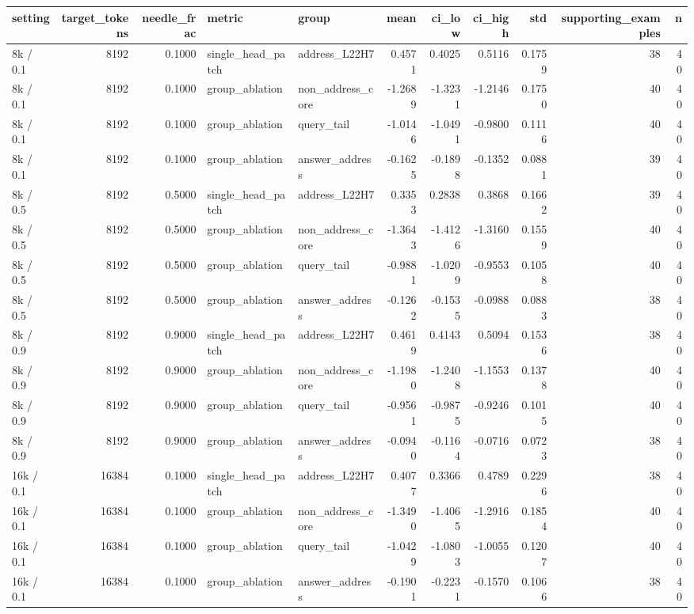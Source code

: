 \begin{tabular}{lrrllrrrrrr}
\toprule
setting & target_tokens & needle_frac & metric & group & mean & ci_low & ci_high & std & supporting_examples & n \\
\midrule
8k / 0.1 & 8192 & 0.1000 & single_head_patch & address_L22H7 & 0.4571 & 0.4025 & 0.5116 & 0.1759 & 38 & 40 \\
8k / 0.1 & 8192 & 0.1000 & group_ablation & non_address_core & -1.2689 & -1.3231 & -1.2146 & 0.1750 & 40 & 40 \\
8k / 0.1 & 8192 & 0.1000 & group_ablation & query_tail & -1.0146 & -1.0491 & -0.9800 & 0.1116 & 40 & 40 \\
8k / 0.1 & 8192 & 0.1000 & group_ablation & answer_address & -0.1625 & -0.1898 & -0.1352 & 0.0881 & 39 & 40 \\
8k / 0.5 & 8192 & 0.5000 & single_head_patch & address_L22H7 & 0.3353 & 0.2838 & 0.3868 & 0.1662 & 39 & 40 \\
8k / 0.5 & 8192 & 0.5000 & group_ablation & non_address_core & -1.3643 & -1.4126 & -1.3160 & 0.1559 & 40 & 40 \\
8k / 0.5 & 8192 & 0.5000 & group_ablation & query_tail & -0.9881 & -1.0209 & -0.9553 & 0.1058 & 40 & 40 \\
8k / 0.5 & 8192 & 0.5000 & group_ablation & answer_address & -0.1262 & -0.1535 & -0.0988 & 0.0883 & 38 & 40 \\
8k / 0.9 & 8192 & 0.9000 & single_head_patch & address_L22H7 & 0.4619 & 0.4143 & 0.5094 & 0.1536 & 38 & 40 \\
8k / 0.9 & 8192 & 0.9000 & group_ablation & non_address_core & -1.1980 & -1.2408 & -1.1553 & 0.1378 & 40 & 40 \\
8k / 0.9 & 8192 & 0.9000 & group_ablation & query_tail & -0.9561 & -0.9875 & -0.9246 & 0.1015 & 40 & 40 \\
8k / 0.9 & 8192 & 0.9000 & group_ablation & answer_address & -0.0940 & -0.1164 & -0.0716 & 0.0723 & 38 & 40 \\
16k / 0.1 & 16384 & 0.1000 & single_head_patch & address_L22H7 & 0.4077 & 0.3366 & 0.4789 & 0.2296 & 38 & 40 \\
16k / 0.1 & 16384 & 0.1000 & group_ablation & non_address_core & -1.3490 & -1.4065 & -1.2916 & 0.1854 & 40 & 40 \\
16k / 0.1 & 16384 & 0.1000 & group_ablation & query_tail & -1.0429 & -1.0803 & -1.0055 & 0.1207 & 40 & 40 \\
16k / 0.1 & 16384 & 0.1000 & group_ablation & answer_address & -0.1901 & -0.2231 & -0.1570 & 0.1066 & 38 & 40 \\

\end{tabular}
